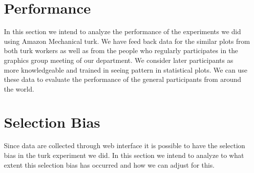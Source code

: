 \documentclass{article}
\begin{document}
\section{Performance} In this section we intend to analyze the performance of the experiments we did using Amazon Mechanical turk. We have feed back data for the similar plots from both turk workers as well as from the people who regularly participates in the graphics group meeting of our department. We consider later participants as more knowledgeable and trained in seeing pattern in statistical plots. We can use these data to evaluate the performance of the general participants from around the world.

\section{Selection Bias} Since data are collected through web interface it is possible to have the selection bias in the turk experiment we did. In this section we intend to analyze to what extent this selection bias has occurred and how we can adjust for this.



 
\end{document}
